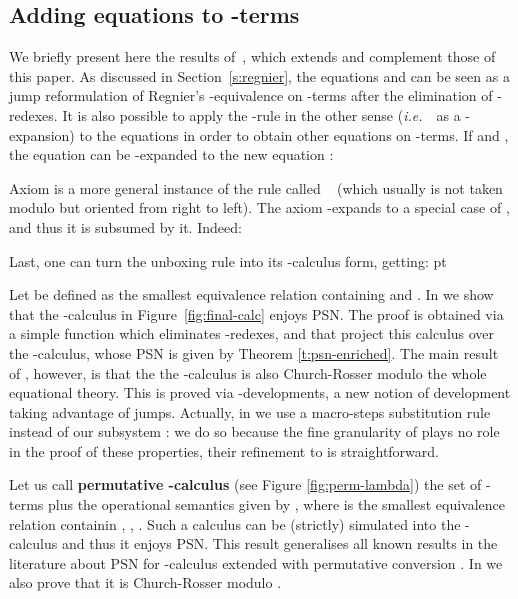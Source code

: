 \documentclass{LMCS}
\newcommand{\ie}{{\it  i.e.}~}
\renewcommand{\>}{\rightarrow}
\newcommand{\deft}[1]{{\bf #1}}
\begin{document}
\subsection{Adding equations to -terms}
\label{ssec:rene}
We briefly present here the results of~\cite{AKLPAR}, which
extends and complement those of this paper. As discussed in
Section~\ref{s:regnier}, the equations  and
 can be seen as a jump reformulation of Regnier's
-equivalence on -terms after the elimination of -redexes. It is
also possible to apply the -rule in the other sense (\ie\ as a -expansion)
to the equations  in order to obtain other
equations  on -terms. If 
and , the equation  can be -expanded to the new equation :
 
Axiom  is a more general
instance of the rule called 
~\cite{Moggi89,DBLP:journals/corr/abs-0806-4859,DBLP:journals/tcs/David11}
(which usually is not taken modulo but oriented from right to left). The axiom
 -expands to a special case of
, and thus it is subsumed 
by it. Indeed:
 
Last, one can turn the unboxing rule into its -calculus form, getting:
 pt

\noindent Let  be defined as the smallest equivalence relation containing
 and . In \cite{AKLPAR} we show
that the -calculus
in Figure~\ref{fig:final-calc} enjoys PSN. The proof is obtained via a
simple function which eliminates -redexes, and that project this
calculus over the -calculus,
whose PSN is given by Theorem \ref{t:psn-enriched}. The main result of
\cite{AKLPAR}, however, is that the the -calculus is also Church-Rosser modulo the
whole equational theory. This is proved via -developments, a
new notion of development taking advantage of jumps. Actually, in
\cite{AKLPAR} we use a macro-steps substitution rule  instead of our subsystem : we do so
because the fine granularity of  plays no role in the
proof of these properties, their refinement to  is
straightforward.\medskip

Let us call \deft{permutative -calculus} (see Figure
\ref{fig:perm-lambda}) the set of -terms plus the operational
semantics given by , where
 is the smallest equivalence relation containin ,
, .  Such a calculus can be (strictly) simulated into
the -calculus and
thus it enjoys PSN. This result generalises all known results in the
literature about PSN for -calculus extended with permutative
conversion
\cite{DBLP:journals/tcs/David11,DBLP:journals/tcs/Santo11,DBLP:journals/corr/abs-0806-4859}. In
\cite{AKLPAR} we also prove that it is Church-Rosser modulo .
\end{document}
